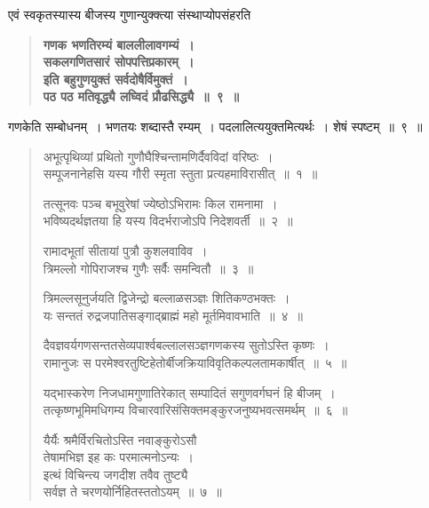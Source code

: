 \documentclass[11pt, openany]{book}
\begin{document}
\newpage

\begin{sloppypar}
{\small एवं स्वकृतस्यास्य बीजस्य गुणान्युक्क्त्या संस्थाप्योपसंहरति\textendash }

 \label{12.9}
\begin{quote}
{\large \textbf{{\color{purple}गणक भणतिरम्यं बाललीलावगम्यं~।\\ 
सकलगणितसारं सोपपत्तिप्रकारम्~।\\
इति बहुगुणयुक्तं सर्वदोषैर्विमुक्तं~। \\
पठ पठ मतिवृद्ध्यै लघ्विदं प्रौढसिद्ध्यै~॥~९~॥ }}}
\end{quote}

गणकेति सम्बोधनम्~। भणतयः शब्दास्तै रम्यम्~। पदलालित्ययुक्तमित्यर्थः~। शेषं स्पष्टम्~॥~९~॥

\begin{quote}
{\small {\color{violet}अभूत्पृथिव्यां प्रथितो गुणौघैश्चिन्तामणिर्दैवविदां वरिष्ठः~। \\
सम्पूजनानेहसि यस्य गौरी स्मृता स्तुता प्रत्यहमाविरासीत्~॥~१~॥}
\vspace{1mm}

{\color{violet}तत्सूनवः पञ्च बभूवुरेषां ज्येष्ठोऽभिरामः किल रामनामा~। \\
भविष्यदर्थज्ञतया हि यस्य विदर्भराजोऽपि निदेशवर्ती~॥~२~॥}
\vspace{1mm}

{\color{violet}रामादभूतां सीतायां पुत्रौ कुशलवाविव~। \\
त्रिमल्लो गोपिराजश्च गुणैः सर्वैः समन्वितौ~॥~३~॥ }
\vspace{1mm}

{\color{violet}त्रिमल्लसूनुर्जयति द्विजेन्द्रो बल्लाळसञ्ज्ञः शितिकण्ठभक्तः~। \\
यः सन्ततं रुद्रजपातिसङ्गाद्ब्राह्मं महो मूर्तमिवावभाति~॥~४~॥ }
\vspace{1mm}

{\color{violet}दैवज्ञवर्यगणसन्ततसेव्यपार्श्वबल्लालसञ्ज्ञगणकस्य सुतोऽस्ति कृष्णः~। \\
रामानुजः स परमेश्वरतुष्टिहेतोर्बीजक्रियाविवृतिकल्पलतामकार्षीत्~॥~५~॥ }
\vspace{1mm}

{\color{violet}यद्भास्करेण निजधामगुणातिरेकात् सम्पादितं सगुणवर्गघनं हि बीजम्~। \\
तत्कृष्णभूमिमधिगम्य विचारवारिसंसिक्तमङ्कुरजनुष्यभवत्समर्थम्~॥~६~॥ }
\vspace{1mm}

{\color{violet}यैर्यैः श्रमैर्विरचितोऽस्ति नवाङ्कुरोऽसौ \\
तेषामभिज्ञ इह कः परमात्मनोऽन्यः~। \\
इत्थं विचिन्त्य जगदीश तवैव तुष्ट्यै \\
सर्वज्ञ ते चरणयोर्निहितस्ततोऽयम्~॥~७~॥ }}
\end{quote}


\end{sloppypar}
\end{document}
